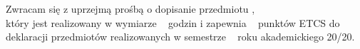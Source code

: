 \documentclass{wmiisubmission}
\begin{document}
\cracowdate
{}
\studentaddress
\addressee{\piotrniemiec}

\vskip 3.0cm


\vskip 0.5cm

Zwracam się z uprzejmą prośbą o dopisanie przedmiotu \dotfill, \\
który jest realizowany w wymiarze \fillField{1.2cm}~ godzin i zapewnia
\fillField{1.2cm}~
punktów ETCS do deklaracji przedmiotów realizowanych w semestrze \dotfill~
roku akademickiego 20\fillField{0.7cm}/20\fillField{0.7cm}.

\vskip 2.0cm

\studentsignature

\vskip 4.0cm

\end{document}
